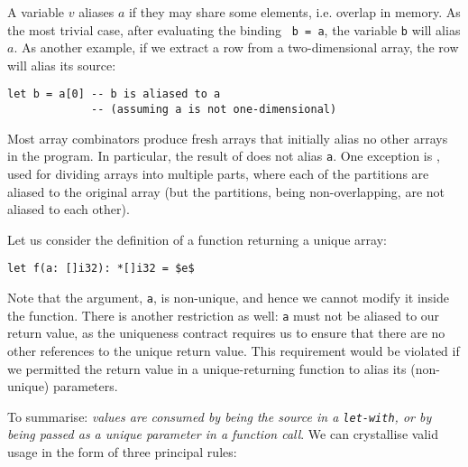 \documentclass[oneside,11pt]{book}
\begin{document}
A variable $v$ aliases $a$ if they may share some elements,
i.e. overlap in memory.  As the most trivial case, after evaluating
the binding \texttt{ b = a}, the variable \texttt{b} will alias
\texttt{$a$}.  As another example, if we extract a row from a
two-dimensional array, the row will alias its source:

\begin{lstlisting}
let b = a[0] -- b is aliased to a
             -- (assuming a is not one-dimensional)
\end{lstlisting}

\noindent
Most array combinators produce fresh arrays that initially alias no
other arrays in the program.  In particular, the result of  does not alias \texttt{a}.  One exception is ,
used for dividing arrays into multiple parts, where each of the
partitions are aliased to the original array (but the partitions,
being non-overlapping, are not aliased to each other).

Let us consider the definition of a function returning a unique array:

\begin{lstlisting}[mathescape=true]
let f(a: []i32): *[]i32 = $e$
\end{lstlisting}

Note that the argument, \texttt{a}, is non-unique, and hence we cannot
modify it inside the function.  There is another restriction as well:
\texttt{a} must not be aliased to our return value, as the uniqueness
contract requires us to ensure that there are no other references to
the unique return value.  This requirement would be violated if we
permitted the return value in a unique-returning function to alias its
(non-unique) parameters.

To summarise: \textit{values are consumed by being the source in a
  \texttt{let-with}, or by being passed as a \textit{unique} parameter
  in a function call}.  We can crystallise valid usage in the form of
three principal rules:
\end{document}
